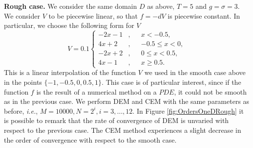 \vspace{2mm}
\noindent\textbf{Rough case.} We consider the same domain $D$ as above, $T = 5$ and $g = \sigma = 3$. We consider $V$ to be piecewise linear, so that $f = -dV$ is piecewise constant. In particular, we choose the following form for $V$
\begin{equation}\label{eq:FunctionsOneDRough}
V = 0.1 
\left \{
\begin{aligned}
	 -2x -1&, && x < -0.5, \\
	 4x + 2&, && -0.5 \leq x < 0, \\
	 -2x + 2&, &&  0 \leq x < 0.5, \\
	 4x - 1&, && x \geq 0.5.
\end{aligned} \right .
\end{equation}
This is a linear interpolation of the function $V$ we used in the smooth case above in the points $\{-1,-0.5,0,0.5,1\}$. This case is of particular interest, since if the function $f$ is the result of a numerical method on a $PDE$, it could not be smooth as in the previous case. We perform DEM and CEM with the same parameters as before, \textit{i.e.}, $M = 10000, N = 2^i,i=3,\dots,12$. In Figure \ref{fig:OrdersOneDRough} it is possible to remark that the rate of convergence of DEM is unvaried with respect to the previous case. The CEM method experiences a slight decrease in the order of convergence with respect to the smooth case.



